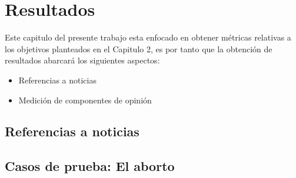 \section{Resultados}
	Este capitulo del presente trabajo esta enfocado en obtener métricas relativas a los objetivos planteados en el Capitulo 2, es por tanto que la obtención de resultados abarcará los siguientes aspectos:
	
	\begin{itemize}
		\item Referencias a noticias
		\item Medición de componentes de opinión  
	\end{itemize}

\subsection{Referencias a noticias}\label{subsec:refnoticias}

	
	
\newpage	
\subsection{Casos de prueba: El aborto}

	